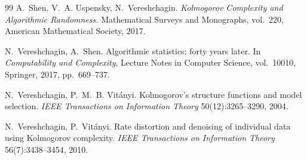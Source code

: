 \documentclass[11pt,a4paper]{article}
\theoremstyle{definition}
\begin{document}
\begin{thebibliography}{99}
 A.~Shen, V.~A. Uspensky, N.~Vereshchagin. \emph{Kolmogorov
  Complexity and Algorithmic Randomness.} Mathematical Surveys and Monographs,
  vol.~220, American Mathematical Society, 2017.

 N.~Vereshchagin, A.~Shen. Algorithmic statistics: forty years
  later. In \emph{Computability and Complexity}, Lecture Notes in Computer
  Science, vol.~10010, Springer, 2017, pp.~669--737.

 N.~Vereshchagin, P.~M.~B. Vit\'anyi. Kolmogorov's structure
  functions and model selection. \emph{IEEE Transactions on Information
  Theory} 50(12):3265--3290, 2004.

 N.~Vereshchagin, P.~Vit\'anyi. Rate distortion and denoising of
  individual data using Kolmogorov complexity. \emph{IEEE Transactions on
  Information Theory} 56(7):3438--3454, 2010.

\end{thebibliography}
\end{document}
